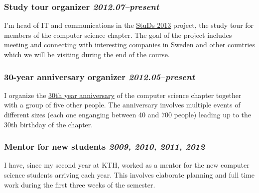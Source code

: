 \documentclass[a4paper,11pt]{article}
\newcommand{\icon}[1]{\textcolor{lightgray}{#1}}
\newcommand{\iconl}[1]{\hspace{-0.5cm}\makebox[0.3cm][c]{\icon{#1}}\hspace{0.2cm}}
\newcommand{\worktitle}[1]{\textbf{#1}}
\newcommand{\duration}[1]{\textsl{#1}}
\newcommand{\thework}[2]{\subsubsection*{%
  \iconl{$\blacksquare$}%
  \worktitle{#1}%
  \hfill\duration{#2}}\par%
}
\begin{document}
\thework{Study tour organizer}{2012.07--present}
I'm head of IT and communications in the \href{http://studieresan.se}{StuDs 2013} project, the study tour for members of the computer science chapter. The goal of the project includes meeting and connecting with interesting companies in Sweden and other countries which we will be visiting during the end of the course.

\thework{30-year anniversary organizer}{2012.05--present}
I organize the \href{http://djubileet.se/}{30th year anniversary} of the computer science chapter together with a group of five other people. The anniversary involves multiple events of different sizes (each one enganging between 40 and 700 people) leading up to the 30th birthday of the chapter.

\thework{Mentor for new students}{2009, 2010, 2011, 2012}
I have, since my second year at KTH, worked as a mentor for the new computer science students arriving each year. This involves elaborate planning and full time work during the first three weeks of the semester.
\end{document}

